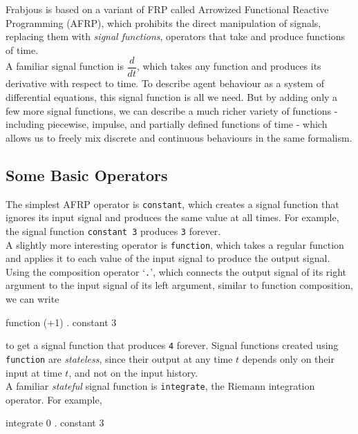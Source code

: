 \documentclass{article}
\begin{document}
Frabjous is based on a variant of FRP called Arrowized Functional Reactive Programming (AFRP), which prohibits the direct manipulation of signals, replacing them with \emph{signal functions}, operators that take and produce functions of time.\\

A familiar signal function is $\dfrac{d}{dt}$, which takes any function and produces its derivative with respect to time. To describe agent behaviour as a system of differential equations, this signal function is all we need. But by adding only a few more signal functions, we can describe a much richer variety of functions - including piecewise, impulse, and partially defined functions of time - which allows us to freely mix discrete and continuous behaviours in the same formalism.

\subsection{Some Basic Operators}
The simplest AFRP operator is \lstinline{constant}, which creates a signal function that ignores its input signal and produces the same value at all times. For example, the signal function \lstinline{constant 3} produces \lstinline{3} forever.\\

A slightly more interesting operator is \lstinline{function}, which takes a regular function and applies it to each value of the input signal to produce the output signal. Using the composition operator `\lstinline{.}', which connects the output signal of its right argument to the input signal of its left argument, similar to function composition, we can write 

\begin{code}
	function (+1) . constant 3
\end{code}

to get a signal function that produces \lstinline{4} forever. Signal functions created using \lstinline{function} are \emph{stateless}, since their output at any time $t$ depends only on their input at time $t$, and not on the input history. \\

 A familiar \emph{stateful} signal function is \lstinline{integrate}, the Riemann integration operator. For example,

 \begin{code}
 	integrate 0 . constant 3
 \end{code}
 
\end{document}
